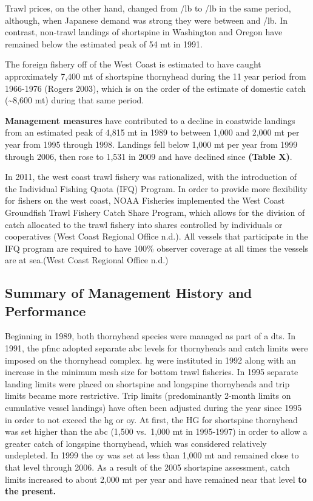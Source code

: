 \documentclass[11pt,
  english,
  letterpaper,
]{article}
\begin{document}
Trawl prices, on the other hand, changed from /lb to /lb in the same period, although, when Japanese demand was strong they were between  and /lb. In contrast, non-trawl landings of shortspine in Washington and Oregon have remained below the estimated peak of 54 mt in 1991.

The foreign fishery off of the West Coast is estimated to have caught approximately 7,400 mt of shortspine thornyhead during the 11 year period from 1966-1976 (Rogers 2003), which is on the order of the estimate of domestic catch (\textasciitilde8,600 mt) during that same period.

\textbf{Management measures} have contributed to a decline in coastwide landings from an estimated peak of 4,815 mt in 1989 to between 1,000 and 2,000 mt per year from 1995 through 1998. Landings fell below 1,000 mt per year from 1999 through 2006, then rose to 1,531 in 2009 and have declined since \textbf{(Table X)}.

In 2011, the west coast trawl fishery was rationalized, with the introduction of the Individual Fishing Quota (IFQ) Program. In order to provide more flexibility for fishers on the west coast, NOAA Fisheries implemented the West Coast Groundfish Trawl Fishery Catch Share Program, which allows for the division of catch allocated to the trawl fishery into shares controlled by individuals or cooperatives (West Coast Regional Office n.d.). All vessels that participate in the IFQ program are required to have 100\% observer coverage at all times the vessels are at sea.(West Coast Regional Office n.d.)

\hypertarget{summary-of-management-history-and-performance}{%
\subsection{Summary of Management History and Performance}\label{summary-of-management-history-and-performance}}

Beginning in 1989, both thornyhead species were managed as part of a \gls{dts}. In 1991, the \gls{pfmc} adopted separate \gls{abc} levels for thornyheads and catch limits were imposed on the thornyhead complex. \gls{hg} were instituted in 1992 along with an increase in the minimum mesh size for bottom trawl fisheries. In 1995 separate landing limits were placed on shortspine and longspine thornyheads and trip limits became more restrictive. Trip limits (predominantly 2-month limits on cumulative vessel landings) have often been adjusted during the year since 1995 in order to not exceed the \gls{hg} or \gls{oy}. At first, the HG for shortspine thornyhead was set higher than the \gls{abc} (1,500 vs.~1,000 mt in 1995-1997) in order to allow a greater catch of longspine thornyhead, which was considered relatively undepleted. In 1999 the \gls{oy} was set at less than 1,000 mt and remained close to that level through 2006. As a result of the 2005 shortspine assessment, catch limits increased to about 2,000 mt per year and have remained near that level \textbf{to the present.}
\end{document}
